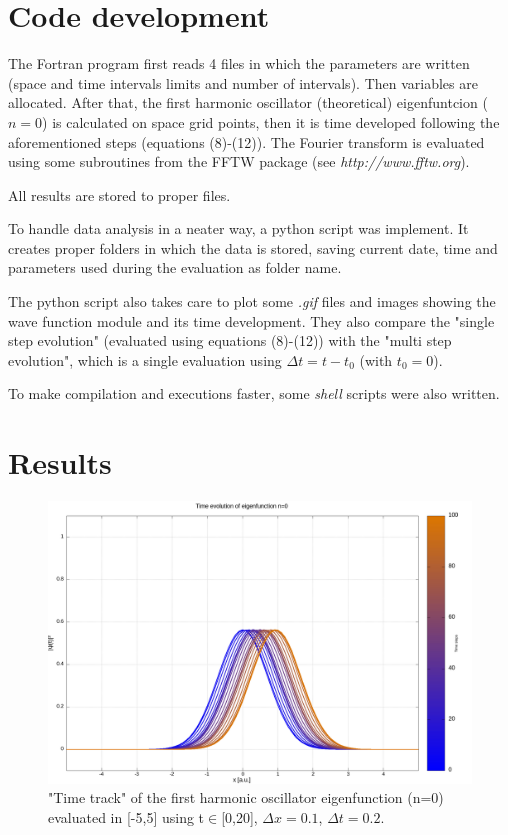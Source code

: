 \documentclass[12pt, a4paper, notitlepage]{report}
\begin{document}
\section*{Code development}
The Fortran program first reads 4 files in which the parameters are written (space and time intervals limits and number of intervals). Then variables are allocated. After that, the first harmonic oscillator (theoretical) eigenfuntcion ($n = 0$) is calculated on space grid points, then it is time developed following the aforementioned steps (equations (8)-(12)). The Fourier transform is evaluated using some subroutines from the FFTW package (see \textit{http://www.fftw.org}).

All results are stored to proper files.

To handle data analysis in a neater way, a python script was implement. It creates proper folders in which the data is stored, saving current date, time and parameters used during the evaluation as folder name.

The python script also takes care to plot some \textit{.gif} files and images showing the wave function module and its time development. They also compare the "single step evolution" (evaluated using equations (8)-(12)) with the "multi step evolution", which is a single evaluation using $\Delta t = t - t_0 $ (with $t_0 = 0$).

To make compilation and executions faster, some \textit{shell} scripts were also written. 

\section*{Results}

\begin{figure}[h!]
	\centering
	\includegraphics[scale=0.25]{col_t_steps__L5,0_deltax0,1_Ttot20,0_deltat0,2.png}
	\caption{"Time track" of the first harmonic oscillator eigenfunction (n=0) evaluated in [-5,5] using t$\in$[0,20], $\Delta x = 0.1$, $\Delta t = 0.2$.}
\end{figure}
\end{document}
